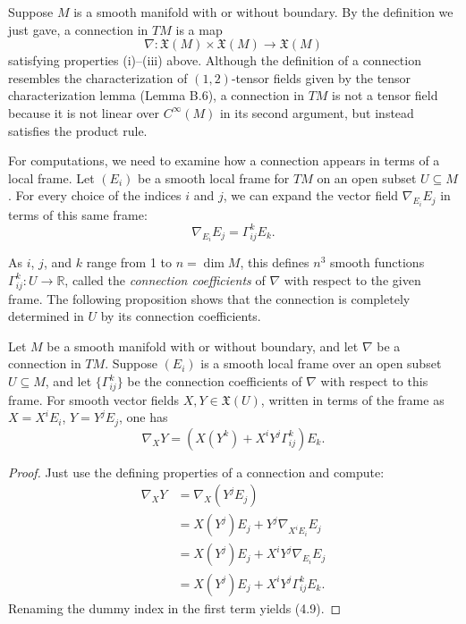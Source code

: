 Suppose $M$ is a smooth manifold with or without boundary. By the definition we just gave, a connection in $TM$ is a map
\[
\nabla: \mathfrak{X}(M) \times \mathfrak{X}(M) \to \mathfrak{X}(M)
\]
satisfying properties (i)--(iii) above. Although the definition of a connection resembles the characterization of $(1,2)$-tensor fields given by the tensor characterization lemma (Lemma B.6), a connection in $TM$ is not a tensor field because it is not linear over $C^\infty(M)$ in its second argument, but instead satisfies the product rule.

For computations, we need to examine how a connection appears in terms of a local frame. Let $(E_i)$ be a smooth local frame for $TM$ on an open subset $U \subseteq M$. For every choice of the indices $i$ and $j$, we can expand the vector field $\nabla_{E_i} E_j$ in terms of this same frame:
\begin{equation}
\nabla_{E_i} E_j = \Gamma^k_{ij} E_k. \tag{4.8}
\end{equation}

As $i$, $j$, and $k$ range from 1 to $n = \dim M$, this defines $n^3$ smooth functions $\Gamma^k_{ij}: U \to \mathbb{R}$, called the \emph{connection coefficients} of $\nabla$ with respect to the given frame. The following proposition shows that the connection is completely determined in $U$ by its connection coefficients.

\begin{proposition}
\label{prop:connection-coefficients-frame}
Let $M$ be a smooth manifold with or without boundary, and let $\nabla$ be a connection in $TM$. Suppose $(E_i)$ is a smooth local frame over an open subset $U \subseteq M$, and let $\{\Gamma^k_{ij}\}$ be the connection coefficients of $\nabla$ with respect to this frame. For smooth vector fields $X,Y \in \mathfrak{X}(U)$, written in terms of the frame as $X = X^i E_i$, $Y = Y^j E_j$, one has
\begin{equation}
\nabla_X Y = \left(X(Y^k) + X^i Y^j \Gamma^k_{ij}\right) E_k. \tag{4.9}
\end{equation}
\end{proposition}

\begin{proof}
Just use the defining properties of a connection and compute:
\begin{align*}
\nabla_X Y &= \nabla_X (Y^j E_j) \\
&= X(Y^j) E_j + Y^j \nabla_{X^i E_i} E_j \\
&= X(Y^j) E_j + X^i Y^j \nabla_{E_i} E_j \\
&= X(Y^j) E_j + X^i Y^j \Gamma^k_{ij} E_k.
\end{align*}
Renaming the dummy index in the first term yields (4.9).
\end{proof}

